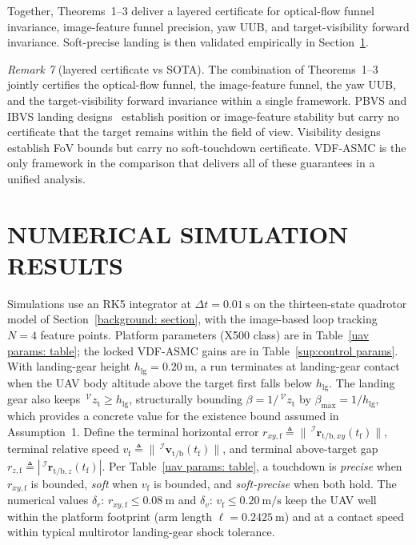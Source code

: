 \documentclass{IEEEtaes}
\begin{document}
Together, Theorems~1--3 deliver a layered certificate for optical-flow funnel invariance, image-feature funnel precision, yaw UUB, and target-visibility forward invariance. Soft-precise landing is then validated empirically in Section~\ref{experimentation: section}.

\textit{Remark 7} (layered certificate vs SOTA). The combination of Theorems~1--3 jointly certifies the optical-flow funnel, the image-feature funnel, the yaw UUB, and the target-visibility forward invariance within a single framework. PBVS and IBVS landing designs~\cite{lin2022, zhang2026, cho2022, lin2023} establish position or image-feature stability but carry no certificate that the target remains within the field of view. Visibility designs~\cite{salehi2021, xie2016} establish FoV bounds but carry no soft-touchdown certificate. VDF-ASMC is the only framework in the comparison that delivers all of these guarantees in a unified analysis.


\section{NUMERICAL SIMULATION RESULTS}
\label{experimentation: section}
Simulations use an RK5 integrator at $\Delta t=0.01~\text{s}$ on the thirteen-state quadrotor model of Section~\ref{background: section}, with the image-based loop tracking $N=4$ feature points. Platform parameters (X500 class) are in Table~\ref{uav params: table}; the locked VDF-ASMC gains are in Table~\ref{sup:control params}. With landing-gear height $h_\text{lg}=0.20~\text{m}$, a run terminates at landing-gear contact when the UAV body altitude above the target first falls below $h_\text{lg}$. The landing gear also keeps $\,^\mathcal{V}z_\text{t}\ge h_\text{lg}$, structurally bounding $\beta=1/\,^\mathcal{V}z_\text{t}$ by $\beta_\text{max}=1/h_\text{lg}$, which provides a concrete value for the existence bound assumed in Assumption~1. Define the terminal horizontal error $r_{xy,\text{f}} \triangleq \|\,^\mathcal{I}\boldsymbol{r}_{\text{t/b},xy}(t_\text{f})\|$, terminal relative speed $v_\text{f} \triangleq \|\,^\mathcal{I}\boldsymbol{v}_{\text{t/b}}(t_\text{f})\|$, and terminal above-target gap $r_{z,\text{f}} \triangleq |\,^\mathcal{I}\boldsymbol{r}_{\text{t/b},z}(t_\text{f})|$. Per Table~\ref{uav params: table}, a touchdown is \emph{precise} when $r_{xy,\text{f}}$ is bounded, \emph{soft} when $v_\text{f}$ is bounded, and \emph{soft-precise} when both hold. The numerical values $\delta_r$: $r_{xy,\text{f}}\le 0.08~\text{m}$ and $\delta_v$: $v_\text{f}\le 0.20~\text{m/s}$ keep the UAV well within the platform footprint (arm length $\ell=0.2425~\text{m}$) and at a contact speed within typical multirotor landing-gear shock tolerance.
\end{document}
